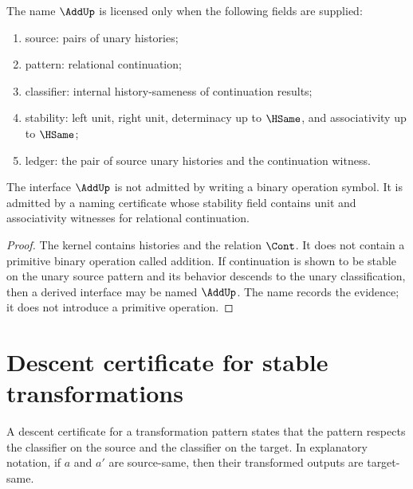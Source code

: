 \begin{definition}
The name \(\AddUp\) is licensed only when the following fields are supplied:
\begin{enumerate}
  \item source: pairs of unary histories;
  \item pattern: relational continuation;
  \item classifier: internal history-sameness of continuation results;
  \item stability: left unit, right unit, determinacy up to \(\HSame\), and associativity up to \(\HSame\);
  \item ledger: the pair of source unary histories and the continuation witness.
\end{enumerate}
\end{definition}

\begin{theorem}
\label{thm:addition-like-behavior-certificate-not-operation}
The interface \(\AddUp\) is not admitted by writing a binary operation symbol. It is admitted by a naming certificate whose stability field contains unit and associativity witnesses for relational continuation.
\end{theorem}

\begin{proof}
The kernel contains histories and the relation \(\Cont\). It does not contain a primitive binary operation called addition. If continuation is shown to be stable on the unary source pattern and its behavior descends to the unary classification, then a derived interface may be named \(\AddUp\). The name records the evidence; it does not introduce a primitive operation.
\end{proof}

\section{Descent certificate for stable transformations}

\begin{definition}
\label{def:descent-certificate}
A descent certificate for a transformation pattern states that the pattern respects the classifier on the source and the classifier on the target. In explanatory notation, if \(a\) and \(a'\) are source-same, then their transformed outputs are target-same.
\end{definition}


